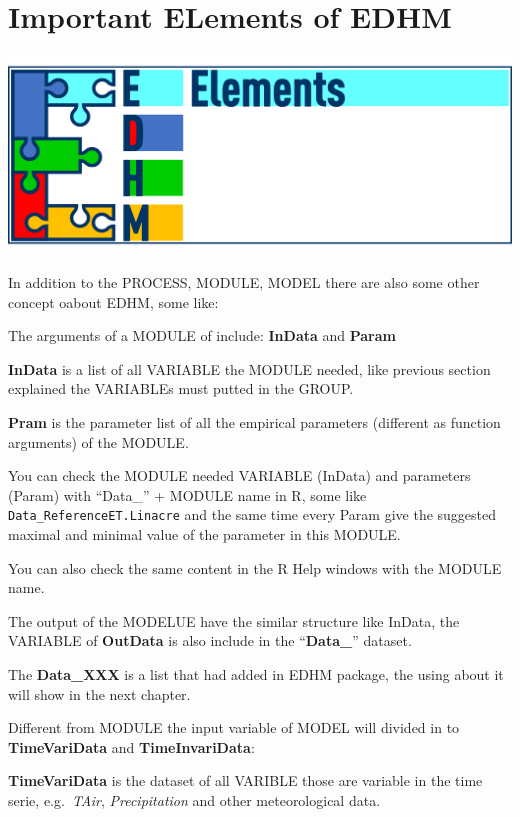 \documentclass[
]{book}
\begin{document}
\hypertarget{important-elements-of-edhm}{%
\section{Important ELements of EDHM}\label{important-elements-of-edhm}}

\includegraphics{fig/EDHM_element.png}

In addition to the PROCESS, MODULE, MODEL there are also some other concept oabout EDHM, some like:

The arguments of a MODULE of include: \textbf{InData} and \textbf{Param}

\textbf{InData} is a list of all VARIABLE the MODULE needed, like previous section explained the VARIABLEs must putted in the GROUP.

\textbf{Pram} is the parameter list of all the empirical parameters (different as function arguments) of the MODULE.

You can check the MODULE needed VARIABLE (InData) and parameters (Param) with ``Data\_'' + MODULE name in R, some like \texttt{Data\_ReferenceET.Linacre} and the same time every Param give the suggested maximal and minimal value of the parameter in this MODULE.

You can also check the same content in the R Help windows with the MODULE name.

The output of the MODELUE have the similar structure like InData, the VARIABLE of \textbf{OutData} is also include in the ``\textbf{Data\_}'' dataset.

The \textbf{Data\_XXX} is a list that had added in EDHM package, the using about it will show in the next chapter.

Different from MODULE the input variable of MODEL will divided in to \textbf{TimeVariData} and \textbf{TimeInvariData}:

\textbf{TimeVariData} is the dataset of all VARIBLE those are variable in the time serie, e.g.~\emph{TAir}, \emph{Precipitation} and other meteorological data.
\end{document}
